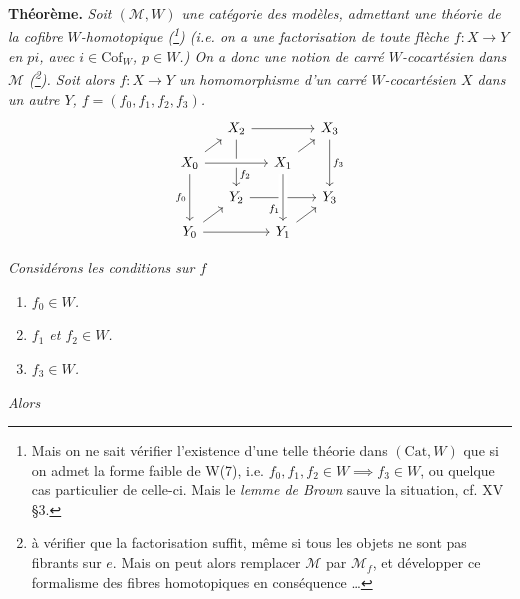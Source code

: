 \documentclass[11pt]{article}
\newcommand{\printedpage}[1]{\marginpar{\footnotesize p.~#1}}
\newcommand{\Cof}{\mathrm{Cof}}
\begin{document}
\setcounter{footnote}{136}
\textbf{Théorème.} \textit{Soit $(\mathcal{M}, W)$ une catégorie des modèles, admettant une théorie de la cofibre $W$-homotopique \textup{(}\footnote{Mais on ne sait vérifier l'existence d'une telle théorie dans $(\mathrm{Cat}, W)$ que si on admet la forme faible de W(7), i.e. $f_0, f_1, f_2 \in W \implies f_3 \in W$, ou quelque cas particulier de celle-ci. Mais le \textit{lemme de Brown} sauve la situation, cf. XV \S3.}\textup{)} (i.e. on a une factorisation de toute flèche $f : X \longrightarrow Y$ en $pi$, avec $i \in \Cof_W$, $p \in W$.) On a donc une notion de carré $W$-cocartésien dans $\mathcal{M}$ \textup{(}\footnote{à vérifier que la factorisation suffit, même si tous les objets ne sont pas fibrants sur $e$. Mais on peut alors remplacer $\mathcal{M}$ par $\mathcal{M}_f$, et développer ce formalisme des fibres homotopiques en conséquence \dots}\textup{)}. Soit
\printedpage{177}
alors $f : X \longrightarrow Y$ un homomorphisme d'un carré $W$-cocartésien $X$ dans un autre $Y$, $f = (f_0, f_1, f_2, f_3)$.}
\[
\begin{tikzcd}[ampersand replacement=\&, column sep=small, row sep=small]
 \& X_2 \arrow[rr] \arrow[dd, "f_2" near end] \& \& X_3 \arrow[dd, "f_3"] \\
X_0 \arrow[ur] \arrow[rr, crossing over] \arrow[dd, "f_0"'] \& \& X_1 \arrow[ur] \& \\
 \& Y_2 \arrow[rr] \& \& Y_3 \\
Y_0 \arrow[ur] \arrow[rr] \& \& Y_1 \arrow[ur] \arrow[from=uu, crossing over, "f_1"' near end] \&
\end{tikzcd}
\]

\textit{Considérons les conditions sur $f$}

\begin{enumerate}
\item[\textit{a)}] \textit{$f_0 \in W$.}
\item[\textit{b)}] \textit{$f_1$ et $f_2 \in W$.}
\item[\textit{c)}] \textit{$f_3 \in W$.}
\end{enumerate}

\textit{Alors}
\end{document}
